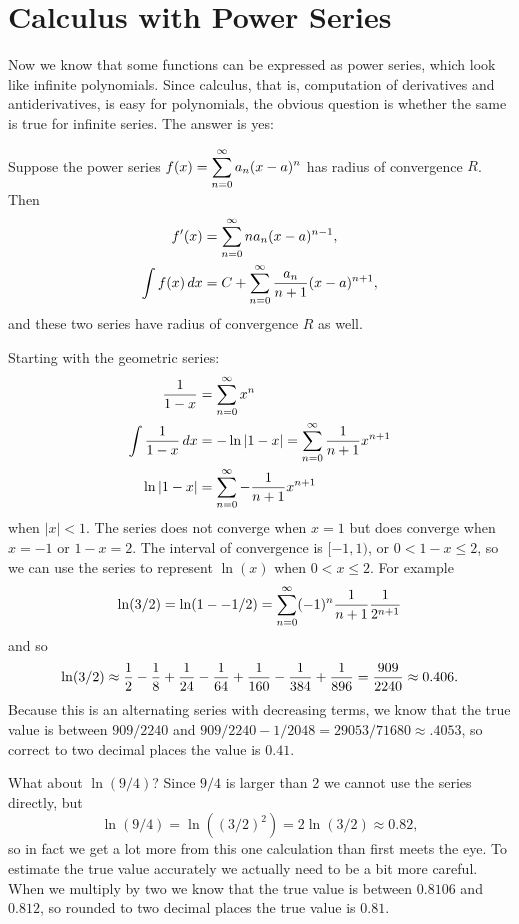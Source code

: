 \chapter{Calculus with Power Series}{}{}

\nobreak
Now we know that some functions can be expressed as power series,
which look like infinite polynomials. Since calculus, that is,
computation of derivatives and antiderivatives, is easy for
polynomials, the obvious question is whether the same is true
for infinite series. The answer is yes:

\begin{theorem} Suppose the power series $f(x)=\displaystyle\sum_{n=0}^\infty a_n(x-a)^n$ has
radius of convergence $R$. Then
\begin{align*}
  f'(x)&=\sum_{n=0}^\infty na_n(x-a)^{n-1}, \\
  \int f(x)\,dx &= C+\sum_{n=0}^\infty {a_n\over n+1}(x-a)^{n+1}, \\
\end{align*}
and these two series have radius of convergence $R$ as well.
\end{theorem}

\begin{example}
Starting with the geometric series:
\begin{align*}
  {1\over 1-x} &= \sum_{n=0}^\infty x^n \\
  \int{1\over 1-x}\,dx &= -\ln|1-x| = \sum_{n=0}^\infty {1\over
    n+1}x^{n+1} \\
  \ln|1-x| &= \sum_{n=0}^\infty -{1\over n+1}x^{n+1} \\
\end{align*}
when $|x|<1$. The series does not converge when $x=1$ but does
converge when $x=-1$ or $1-x=2$. The interval of convergence is
$[-1,1)$, or $0<1-x\le2$, so
we can use the series to represent $\ln(x)$
when $0<x\le2$. For example
$$
  \ln(3/2)=\ln(1--1/2)=
  \sum_{n=0}^\infty (-1)^n{1\over n+1}{1\over 2^{n+1}}
$$
and so
$$
  \ln(3/2)\approx {1\over 2}-{1\over 8}+{1\over 24}-{1\over 64}
  +{1\over 160}-{1\over 384}+{1\over 896}
  ={909\over 2240}\approx 0.406
.$$
Because this is an alternating series with decreasing terms,
we know that the true value is between $909/2240$ and
$909/2240-1/2048=29053/71680\approx .4053$, so correct to two decimal
places the value is $0.41$. 

What about $\ln(9/4)$? Since $9/4$ is larger than 2 we cannot use the
series directly, but
$$\ln(9/4)=\ln((3/2)^2)=2\ln(3/2)\approx 0.82,$$
so in fact we get a lot more from this one calculation than first
meets the eye. To estimate the true value accurately we actually need
to be a bit more careful.
When we multiply by two we know that the true value is between
$0.8106$ and $0.812$, so rounded to two decimal places the true value
is $0.81$.
\end{example}

